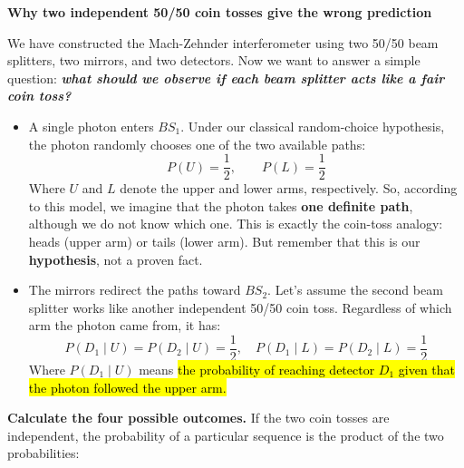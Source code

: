 \begin{flushleft}
    \textcolor{Green3}{ \textbf{Why two independent 50/50 coin tosses give the wrong prediction}}
\end{flushleft}
We have constructed the Mach-Zehnder interferometer using two 50/50 beam splitters, two mirrors, and two detectors. Now we want to answer a simple question: \textbf{\emph{what should we observe if each beam splitter acts like a fair coin toss?}}
\begin{itemize}
    \item {} A single photon enters ${BS}_1$. Under our classical random-choice hypothesis, the photon randomly chooses one of the two available paths:
        \begin{equation*}
            P(U)=\frac{1}{2},\qquad P(L)=\frac{1}{2}
        \end{equation*}
        Where $U$ and $L$ denote the upper and lower arms, respectively. So, according to this model, we imagine that the photon takes \textbf{one definite path}, although we do not know which one. This is exactly the coin-toss analogy: heads (upper arm) or tails (lower arm). But remember that this is our \textbf{hypothesis}, not a proven fact.

    \item {} The mirrors redirect the paths toward ${BS}_2$. Let's assume the second beam splitter works like another independent 50/50 coin toss. Regardless of which arm the photon came from, it has:
        \begin{equation*}
            P\left(D_{1} \mid U\right) = P\left(D_{2} \mid U\right) = \frac{1}{2}, \quad P\left(D_{1} \mid L\right) = P\left(D_{2} \mid L\right) = \frac{1}{2}
        \end{equation*}
        Where $P\left(D_{1} \mid U\right)$ means \hl{the probability of reaching detector $D_1$ given that the photon followed the upper arm.}
\end{itemize}
\textcolor{Green3}{ \textbf{Calculate the four possible outcomes.}} If the two coin tosses are independent, the probability of a particular sequence is the product of the two probabilities:


